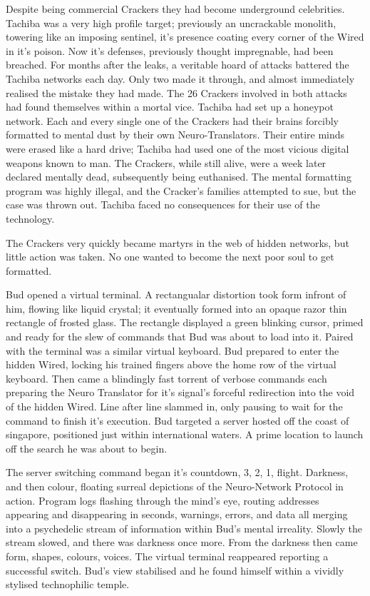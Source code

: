 \documentclass{book}
\begin{document}
Despite being commercial Crackers they had become underground celebrities. Tachiba was a very high profile target; previously an uncrackable monolith, towering like an imposing sentinel, it's presence coating every corner of the Wired in it's poison. Now it's defenses, previously thought impregnable, had been breached. For months after the leaks, a veritable hoard of attacks battered the Tachiba networks each day. Only two made it through, and almost immediately realised the mistake they had made. The 26 Crackers involved in both attacks had found themselves within a mortal vice. Tachiba had set up a honeypot network. Each and every single one of the Crackers had their brains forcibly formatted to mental dust by their own Neuro-Translators. Their entire minds were erased like a hard drive; Tachiba had used one of the most vicious digital weapons known to man. The Crackers, while still alive, were a week later declared mentally dead, subsequently being euthanised. The mental formatting program was highly illegal, and the Cracker's families attempted to sue, but the case was thrown out. Tachiba faced no consequences for their use of the technology.

The Crackers very quickly became martyrs in the web of hidden networks, but little action was taken. No one wanted to become the next poor soul to get formatted.

Bud opened a virtual terminal. A rectangualar distortion took form infront of him, flowing like liquid crystal; it eventually formed into an opaque razor thin rectangle of frosted glass. The rectangle displayed a green blinking cursor, primed and ready for the slew of commands that Bud was about to load into it. Paired with the terminal was a similar virtual keyboard. Bud prepared to enter the hidden Wired, locking his trained fingers above the home row of the virtual keyboard. Then came a blindingly fast torrent of verbose commands each preparing the Neuro Translator for it's signal's forceful redirection into the void of the hidden Wired. Line after line slammed in, only pausing to wait for the command to finish it's execution. Bud targeted a server hosted off the coast of singapore, positioned just within international waters. A prime location to launch off the search he was about to begin.

The server switching command began it's countdown, 3, 2, 1, flight. Darkness, and then colour, floating surreal depictions of the Neuro-Network Protocol in action. Program logs flashing through the mind's eye, routing addresses appearing and disappearing in seconds, warnings, errors, and data all merging into a psychedelic stream of information within Bud's mental irreality. Slowly the stream slowed, and there was darkness once more. From the darkness then came form, shapes, colours, voices. The virtual terminal reappeared reporting a successful switch. Bud's view stabilised and he found himself within a vividly stylised technophilic temple.
\end{document}
